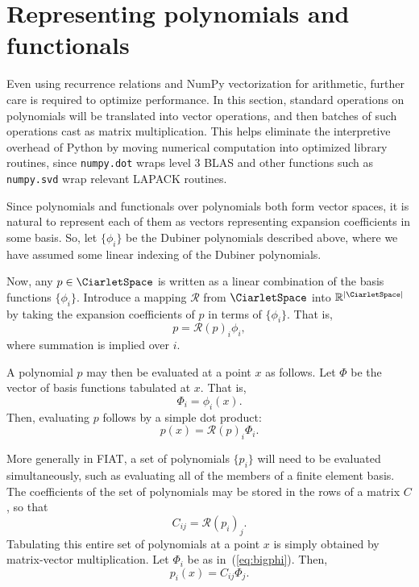\section{Representing polynomials and functionals}

Even using recurrence relations and NumPy vectorization for
arithmetic, further care is required to optimize performance.  In this
section, standard operations on polynomials will be translated into
vector operations, and then batches of such operations cast as matrix
multiplication.  This helps eliminate the interpretive overhead of Python
by moving numerical computation into optimized library routines,
since \texttt{numpy.dot} wraps level 3 BLAS and other functions such as
\texttt{numpy.svd} wrap relevant LAPACK routines.

Since polynomials and functionals over polynomials both form vector
spaces, it is natural to represent each of them as vectors representing
expansion coefficients in some basis.  So, let \( \{ \phi_i \} \) be the
Dubiner polynomials described above, where we have assumed
some linear indexing of the Dubiner polynomials.

Now, any \( p \in \CiarletSpace \) is written as a linear combination of the basis
functions \( \{ \phi_i \} \).  Introduce a mapping \( \mathcal{R} \) from
\( \CiarletSpace \) into \( \mathbb{R}^{|\CiarletSpace|} \) by taking the expansion coefficients
of \( p \) in terms of \( \{ \phi_i \} \).  That is,
\[
p = \mathcal{R}(p)_i \phi_i,
\]
where summation is implied over \( i \).

A polynomial \( p \) may then be evaluated at a point \( x \) as follows.
Let \( \Phi \) be the vector of basis functions tabulated at \( x \).
That is,
\begin{equation}
\label{eq:bigphi}
\Phi_i = \phi_i(x).
\end{equation}
Then, evaluating \( p \) follows by a simple dot product:
\begin{equation}
\label{eq:doteval}
p(x) = \mathcal{R}(p)_i \Phi_i.
\end{equation}

More generally in FIAT, a set of polynomials \( \{ p_i \} \) will need
to be evaluated simultaneously, such as evaluating all of the members
of a finite element basis.  The coefficients of the set of polynomials
may be stored in the rows of a matrix \( C \), so that
\[
C_{ij} = \mathcal{R}(p_i)_j.
\]
Tabulating this entire set of polynomials at a point \( x \) is simply
obtained by matrix-vector multiplication.  Let \( \Phi_i \) be as
in~(\ref{eq:bigphi}).  Then,
\[
p_i(x) = C_{ij} \Phi_j.
\]

